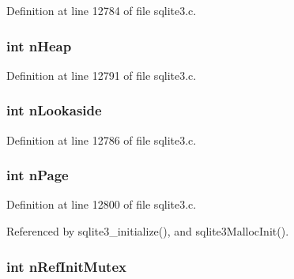 Definition at line 12784 of file sqlite3.\+c.

\hypertarget{struct_sqlite3_config_a0ea077b3d2d24303af5a30df4d9d5edf}{}
\subsubsection[{n\+Heap}]{\setlength{\rightskip}{0pt plus 5cm}int n\+Heap}\label{struct_sqlite3_config_a0ea077b3d2d24303af5a30df4d9d5edf}


Definition at line 12791 of file sqlite3.\+c.

\hypertarget{struct_sqlite3_config_af7546c4257d5b6d4ebcea412f3329067}{}
\subsubsection[{n\+Lookaside}]{\setlength{\rightskip}{0pt plus 5cm}int n\+Lookaside}\label{struct_sqlite3_config_af7546c4257d5b6d4ebcea412f3329067}


Definition at line 12786 of file sqlite3.\+c.

\hypertarget{struct_sqlite3_config_a006467184a1acc90b6f1b18626889e08}{}
\subsubsection[{n\+Page}]{\setlength{\rightskip}{0pt plus 5cm}int n\+Page}\label{struct_sqlite3_config_a006467184a1acc90b6f1b18626889e08}


Definition at line 12800 of file sqlite3.\+c.



Referenced by sqlite3\+\_\+initialize(), and sqlite3\+Malloc\+Init().

\hypertarget{struct_sqlite3_config_a82be072aed4e06af77240a619da95f76}{}
\subsubsection[{n\+Ref\+Init\+Mutex}]{\setlength{\rightskip}{0pt plus 5cm}int n\+Ref\+Init\+Mutex}\label{struct_sqlite3_config_a82be072aed4e06af77240a619da95f76}


